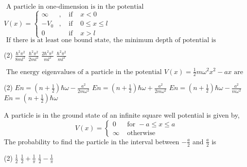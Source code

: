 \begin{enumerate}
\begin{tasks}
\end{tasks}
\begin{minipage}{\textwidth}
	\item $\text { A particle in one-dimension is in the potential }$
	$V(x)=\left\{\begin{array}{llll}
	\infty & , & \text { if } & x<0 \\
	-V_{0} & , & \text { if } & 0 \leq x \leq l \\
	0 & & \text { if } & x>l
	\end{array}\right.$
	$\text { If there is at least one bound state, the minimum depth of potential is }$
\end{minipage}
\begin{tasks}(2)
	\task[\textbf{A.}] $\frac{\hbar^{2} \pi^{2}}{8 m l^{2}}$
	\task[\textbf{B.}]$\frac{\hbar^{2} \pi^{2}}{2 m l^{2}}$
	\task[\textbf{C.}]$\frac{2 \hbar^{2} \pi^{2}}{m l^{2}}$
	\task[\textbf{D.}]$\frac{\hbar^{2} \pi^{2}}{m l^{2}}$
\end{tasks}
\begin{minipage}{\textwidth}
	\item $\text { The energy eigenvalues of a particle in the potential } V(x)=\frac{1}{2} m \omega^{2} x^{2}-a x \text { are }$
\end{minipage}
\begin{tasks}(2)
	\task[\textbf{A.}] $E n=\left(n+\frac{1}{2}\right) \hbar \omega-\frac{a^{2}}{2 m \omega^{2}}$
	\task[\textbf{B.}]$E n=\left(n+\frac{1}{2}\right) \hbar \omega+\frac{a^{2}}{2 m \omega^{2}}$
	\task[\textbf{C.}]$E n=\left(n+\frac{1}{2}\right) \hbar \omega-\frac{a^{2}}{m \omega^{2}}$
	\task[\textbf{D.}]$E n=\left(n+\frac{1}{2}\right) \hbar \omega$
\end{tasks}
\begin{minipage}{\textwidth}
	\item A particle is in the ground state of an infinite square well potential is given by,
	$$
	V(x)= \begin{cases}0 & \text { for }-a \leq x \leq a \\ \infty & \text { otherwise }\end{cases}
	$$
	The probability to find the particle in the interval between $-\frac{a}{2}$ and $\frac{a}{2}$ is
\end{minipage}
\begin{tasks}(2)
	\task[\textbf{A.}] $\frac{1}{2}$ 
	\task[\textbf{B.}]$\frac{1}{2}+\frac{1}{\pi}$
	\task[\textbf{C.}]$\frac{1}{2}-\frac{1}{\pi}$

\end{tasks}
\end{enumerate}

